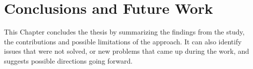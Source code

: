\chapter{Conclusions and Future Work}
\label{chap:conc}

This Chapter concludes the thesis by summarizing the findings from the study, the contributions and possible limitations of the approach. It can also identify issues that were not solved, or new problems that came up during the work, and suggests possible directions going forward. \cite{Foldvik1985b}